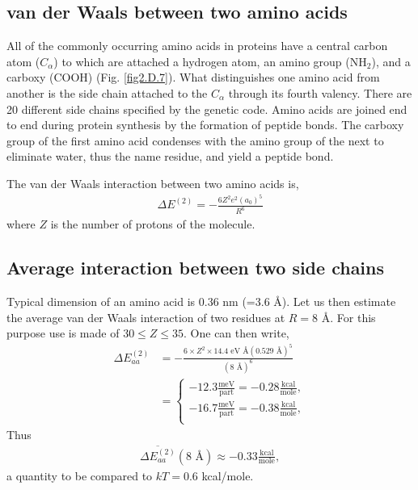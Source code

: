 \begin{subappendices}
 \subsection{van der Waals between two amino acids}
 All of the commonly occurring amino acids in proteins have a central carbon atom ($C_\alpha$) to which are attached a hydrogen atom, an amino group (NH$_2$), and a carboxy (COOH) (Fig. \ref{fig2.D.7}). What distinguishes one amino acid from another is the side chain attached to the $C_\alpha$ through its fourth valency. There are 20 different side chains specified by the genetic code.
 Amino acids are joined end to end during protein synthesis by the formation of peptide bonds. The carboxy group of the first amino acid condenses with the amino group of the next to eliminate water, thus the name residue, and yield a peptide bond.
 
 
 The van der Waals interaction between two amino acids is,
   \begin{align}\label{eq2.D.26}
\Delta E^{(2)}=-\frac{6Z^2e^2(a_0)^5}{R^6}
   \end{align} 
 where $Z$ is the number of protons of the molecule.
 \subsection{Average interaction between two side chains}
 Typical dimension of an amino acid is 0.36 nm (=3.6 \AA). Let us then estimate the average van der Waals interaction of two residues at $R=8$ \AA. For this purpose use is made of $30\leq Z\leq 35$. One can then write,
   \begin{align}\label{eq2.D.27}
\nonumber \Delta E_{aa}^{(2)}&=-\frac{6\times Z^2\times 14.4\text{ eV \AA} (0.529\text{ \AA})^5}{(8\text{ \AA})^6}\\
&=\left\{\begin{array}{c}
 -12.3\frac{\text{meV}}{\text{part}}=-0.28\frac{\text{kcal}}{\text{mole}},\\
  -16.7\frac{\text{meV}}{\text{part}}=-0.38\frac{\text{kcal}}{\text{mole}},\\
\end{array}\right. 
   \end{align} 
 Thus
    \begin{align}\label{eq2.D.28}
\overline{\Delta E_{aa}^{(2)}}(8\text{ \AA})\approx-0.33\frac{\text{kcal}}{\text{mole}},
    \end{align} 
 a quantity to be compared to $kT=0.6$ kcal/mole.
 

\end{subappendices}
